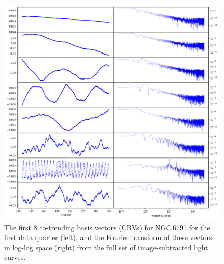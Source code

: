 \begin{figure}
    \centering
    \includegraphics[width=\linewidth]{Chapter5/cbv_6791_q01.png}
    \caption[Custom co-trending basis vectors with Fourier transforms (I) Full image-subtracted subset]{The first 8 co-trending basis vectors (CBVs) for NGC\,6791 for the first data quarter (left), and the Fourier transform of these vectors in log-log space (right) from the full set of image-subtracted light curves.}
    \label{fig:cbvs_allIS_Q1}
\end{figure}

